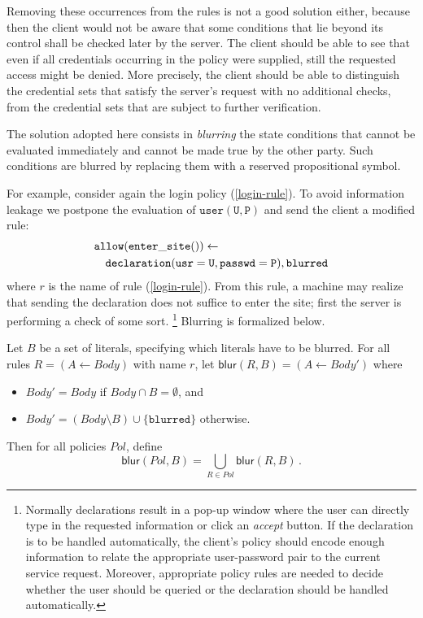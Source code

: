 \documentclass{article}
\newcommand{\m}[1]{\ensuremath{\mathsf{#1}}}
\newcommand{\s}[1]{\ensuremath{\mathtt{#1}}}
\newcommand{\x}[1]{\ensuremath{\mathit{#1}}}
\begin{document}
Removing these occurrences from the rules is not a good solution
either, because then the client would not be aware that some
conditions that lie beyond its control shall be checked later by the
server.  The client should be able to see that even if all credentials
occurring in the policy were supplied, still the requested access
might be denied.  More precisely, the client should be able to
distinguish the credential sets that satisfy the server's request with
no additional checks, from the credential sets that are subject to
further verification.

The solution adopted here consists in \emph{blurring} the state
conditions that cannot be evaluated immediately and cannot be made
true by the other party.  Such conditions are blurred by replacing
them with a reserved propositional symbol.

For example, consider again the login policy (\ref{login-rule}). To
avoid information leakage we postpone the evaluation of \s{user(U,P) } and
send the client a modified rule:
\begin{eqnarray}
\nonumber
\lefteqn{   \s{allow(enter\_site())} \leftarrow } \\
& &     \s{declaration(usr=U,passwd=P)}, \nonumber
        \s{blurred}
\nonumber
\end{eqnarray}
where $r$ is the name of rule (\ref{login-rule}).  From this rule, a
machine may realize that sending the declaration does not suffice to
enter the site; first the server is performing a check of some sort.%
\footnote{
  Normally declarations result in a pop-up window where the user can
  directly type in the requested information or click an
  \emph{accept} button.  If the declaration is to be handled
  automatically, the client's policy should encode enough information to
  relate the appropriate user-password pair to the current service
  request.  Moreover, appropriate policy rules are needed to decide
  whether the user should be queried or the declaration should be
  handled automatically.
}
Blurring is formalized below.

Let $B$ be a set of literals, specifying which literals have to be
blurred.  For all rules $R =(A \leftarrow \x{Body})$ with name $r$,
let $\m{blur}(R, B) = (A \leftarrow \x{Body'})$ where 
\begin{itemize}
\item \x{Body' = Body} if \x{Body \cap B=\emptyset}, and
\item \x{Body' = (Body \setminus B) \cup \{\s{blurred}\} } otherwise.
\end{itemize}
Then for all policies \x{Pol}, define 
$$\m{blur}(\x{Pol}, B) =
\bigcup_{R\in\x{Pol}} \m{blur}(R,B) \,.$$
\end{document}
